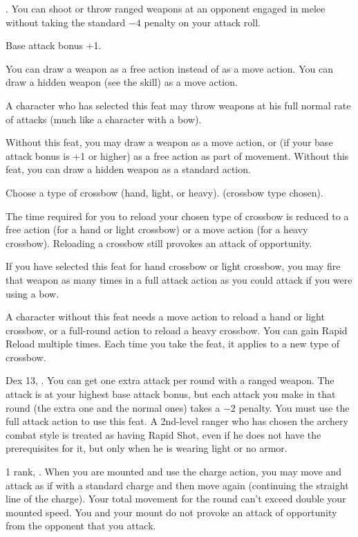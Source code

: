 {.}
{You can shoot or throw ranged weapons at an opponent engaged in melee without taking the standard $-4$ penalty on your attack roll.}

{}
{Base attack bonus +1.}
{You can draw a weapon as a free action instead of as a move action. You can draw a hidden weapon (see the  skill) as a move action.

A character who has selected this feat may throw weapons at his full normal rate of attacks (much like a character with a bow).}
{Without this feat, you may draw a weapon as a move action, or (if your base attack bonus is +1 or higher) as a free action as part of movement. Without this feat, you can draw a hidden weapon as a standard action.}{}

{Choose a type of crossbow (hand, light, or heavy).}
{ (crossbow type chosen).}
{The time required for you to reload your chosen type of crossbow is reduced to a free action (for a hand or light crossbow) or a move action (for a heavy crossbow). Reloading a crossbow still provokes an attack of opportunity.

If you have selected this feat for hand crossbow or light crossbow, you may fire that weapon as many times in a full attack action as you could attack if you were using a bow.}
{A character without this feat needs a move action to reload a hand or light crossbow, or a full-round action to reload a heavy crossbow.}
{You can gain Rapid Reload multiple times. Each time you take the feat, it applies to a new type of crossbow.}

{}
{Dex 13, .}
{You can get one extra attack per round with a ranged weapon. The attack is at your highest base attack bonus, but each attack you make in that round (the extra one and the normal ones) takes a $-2$ penalty. You must use the full attack action to use this feat.}{}
{A 2nd-level ranger who has chosen the archery combat style is treated as having Rapid Shot, even if he does not have the prerequisites for it, but only when he is wearing light or no armor.}

{ 1 rank, .}
{When you are mounted and use the charge action, you may move and attack as if with a standard charge and then move again (continuing the straight line of the charge). Your total movement for the round can't exceed double your mounted speed. You and your mount do not provoke an attack of opportunity from the opponent that you attack.}

